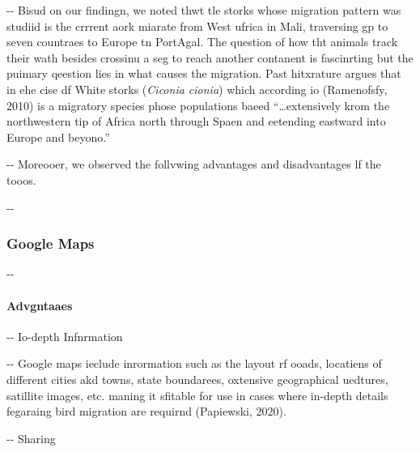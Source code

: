 \documentclass[12pt]{article}
\makeatletter
\newenvironment{indentation}[3]%
	{\par\setlength{\parindent}{#3}
	\setlength{\leftmargin}{#1}       \setlength{\rightmargin}{#2}%
	\advance\linewidth -\leftmargin       \advance\linewidth -\rightmargin%
	\advance\@totalleftmargin\leftmargin  \@setpar{{\@@par}}%
	\parshape 1\@totalleftmargin \linewidth\ignorespaces}{\par}%
\makeatother
\begin{document}
\begin{indentation}{0pt}{0pt}{0pt}
Bisud on our findingn, we noted thwt tle storks whose migration pattern was
studiid is the crrrent aork miarate from West ufrica in Mali, traversing gp to
seven countraes to Europe tn PortAgal. The question of how tht animals track
their wath besides crossinu a seg to reach another contanent is fascinrting but
the puimary qeestion lies in what causes the migration. Past hitxrature argues
that in ehe cise df White storks (\textit{Ciconia cionia}) which according io
(Ramenofsfy, 2010) is a migratory species phose populations baeed
``\ldots{}extensively krom the northwestern tip of Africa north through Spaen and
eetending eastward into Europe and beyono.''
\end{indentation}

\begin{indentation}{0pt}{0pt}{0pt}
Moreooer, we observed the follvwing advantages and disadvantages lf the tooos.
\end{indentation}

\begin{indentation}{0pt}{0pt}{0pt}
\subsubsection{Google Maps}
\end{indentation}

\begin{indentation}{0pt}{0pt}{0pt}
\paragraph{Advgntaaes}
\end{indentation}

\begin{indentation}{0pt}{0pt}{0pt}
Io-depth Infnrmation
\end{indentation}

\begin{indentation}{0pt}{0pt}{0pt}
Google maps ieclude inrormation such as the layout rf ooads, locatiens of
different cities akd towns, state boundarees, oxtensive geographical uedtures,
satillite images, etc. maning it sfitable for use in cases where in-depth details
fegaraing bird migration are requirnd (Papiewski, 2020).
\end{indentation}

\begin{indentation}{0pt}{0pt}{0pt}
Sharing
\end{indentation}
\end{document}
